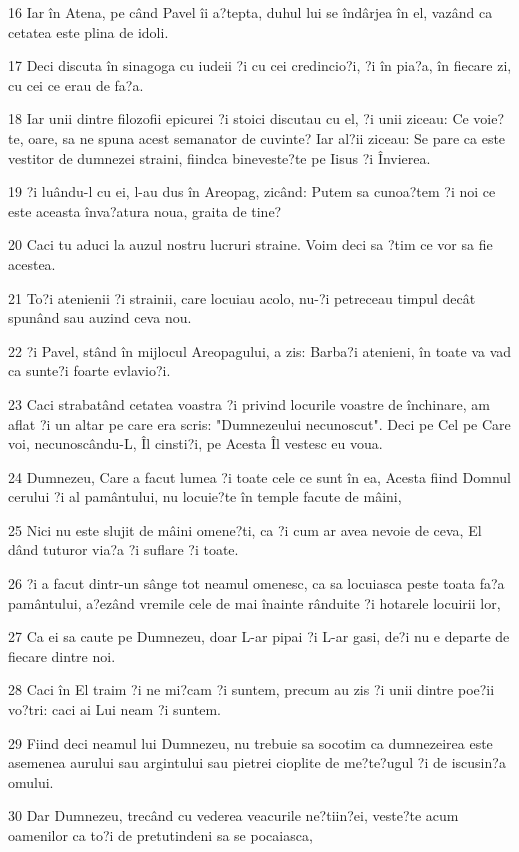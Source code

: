 \par 16 Iar în Atena, pe când Pavel îi a?tepta, duhul lui se îndârjea în el, vazând ca cetatea este plina de idoli.
\par 17 Deci discuta în sinagoga cu iudeii ?i cu cei credincio?i, ?i în pia?a, în fiecare zi, cu cei ce erau de fa?a.
\par 18 Iar unii dintre filozofii epicurei ?i stoici discutau cu el, ?i unii ziceau: Ce voie?te, oare, sa ne spuna acest semanator de cuvinte? Iar al?ii ziceau: Se pare ca este vestitor de dumnezei straini, fiindca bineveste?te pe Iisus ?i Învierea.
\par 19 ?i luându-l cu ei, l-au dus în Areopag, zicând: Putem sa cunoa?tem ?i noi ce este aceasta înva?atura noua, graita de tine?
\par 20 Caci tu aduci la auzul nostru lucruri straine. Voim deci sa ?tim ce vor sa fie acestea.
\par 21 To?i atenienii ?i strainii, care locuiau acolo, nu-?i petreceau timpul decât spunând sau auzind ceva nou.
\par 22 ?i Pavel, stând în mijlocul Areopagului, a zis: Barba?i atenieni, în toate va vad ca sunte?i foarte evlavio?i.
\par 23 Caci strabatând cetatea voastra ?i privind locurile voastre de închinare, am aflat ?i un altar pe care era scris: "Dumnezeului necunoscut". Deci pe Cel pe Care voi, necunoscându-L, Îl cinsti?i, pe Acesta Îl vestesc eu voua.
\par 24 Dumnezeu, Care a facut lumea ?i toate cele ce sunt în ea, Acesta fiind Domnul cerului ?i al pamântului, nu locuie?te în temple facute de mâini,
\par 25 Nici nu este slujit de mâini omene?ti, ca ?i cum ar avea nevoie de ceva, El dând tuturor via?a ?i suflare ?i toate.
\par 26 ?i a facut dintr-un sânge tot neamul omenesc, ca sa locuiasca peste toata fa?a pamântului, a?ezând vremile cele de mai înainte rânduite ?i hotarele locuirii lor,
\par 27 Ca ei sa caute pe Dumnezeu, doar L-ar pipai ?i L-ar gasi, de?i nu e departe de fiecare dintre noi.
\par 28 Caci în El traim ?i ne mi?cam ?i suntem, precum au zis ?i unii dintre poe?ii vo?tri: caci ai Lui neam ?i suntem.
\par 29 Fiind deci neamul lui Dumnezeu, nu trebuie sa socotim ca dumnezeirea este asemenea aurului sau argintului sau pietrei cioplite de me?te?ugul ?i de iscusin?a omului.
\par 30 Dar Dumnezeu, trecând cu vederea veacurile ne?tiin?ei, veste?te acum oamenilor ca to?i de pretutindeni sa se pocaiasca,
